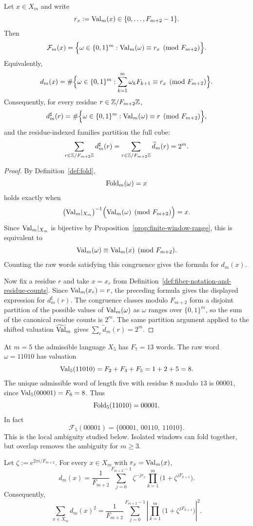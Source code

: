 \begin{theorem}\label{thm:fiber-residue}
Let $x\in X_m$ and write
\[
r_x:=\mathrm{Val}_m(x)\in\{0,\ldots,F_{m+2}-1\}.
\]
Then
\[
\mathcal F_m(x)=
\Bigl\{\omega\in\{0,1\}^m:
\mathrm{Val}_m(\omega)\equiv r_x \pmod {F_{m+2}}\Bigr\}.
\]
Equivalently,
\[
d_m(x)=
\#\Bigl\{\omega\in\{0,1\}^m:
\sum_{k=1}^m\omega_kF_{k+1}\equiv r_x\pmod {F_{m+2}}\Bigr\}.
\]
Consequently, for every residue $r\in\mathbb{Z}/F_{m+2}\mathbb{Z}$,
\[
d_m^\sharp(r)=
\#\Bigl\{\omega\in\{0,1\}^m:
\mathrm{Val}_m(\omega)\equiv r\pmod {F_{m+2}}\Bigr\},
\]
and the residue-indexed families partition the full cube:
\[
\sum_{r\in\mathbb{Z}/F_{m+2}\mathbb{Z}} d_m^\sharp(r)
=
\sum_{r\in\mathbb{Z}/F_{m+2}\mathbb{Z}} \widetilde d_m(r)
=2^m.
\]
\end{theorem}

\begin{proof}
By Definition~\ref{def:fold},
\[
\mathrm{Fold}_m(\omega)=x
\]
holds exactly when
\[
\bigl(\mathrm{Val}_m|_{X_m}\bigr)^{-1}
\Bigl(\mathrm{Val}_m(\omega)\pmod {F_{m+2}}\Bigr)=x.
\]
Since $\mathrm{Val}_m|_{X_m}$ is bijective by
Proposition~\ref{prop:finite-window-range}, this is equivalent to
\[
\mathrm{Val}_m(\omega)\equiv\mathrm{Val}_m(x)\pmod {F_{m+2}}.
\]
Counting the raw words satisfying this congruence gives the formula for
$d_m(x)$.

Now fix a residue $r$ and take $x=x_r$ from
Definition~\ref{def:fiber-notation-and-residue-counts}.  Since
$\mathrm{Val}_m(x_r)=r$, the preceding formula gives the displayed expression for
$d_m^\sharp(r)$.  The congruence classes modulo $F_{m+2}$ form a disjoint
partition of the possible values of $\mathrm{Val}_m(\omega)$ as
$\omega$ ranges over $\{0,1\}^m$, so the sum of the canonical residue counts is
$2^m$.  The same partition argument applied to the shifted valuation
$\widetilde{\mathrm{Val}}_m$ gives
$\sum_r\widetilde d_m(r)=2^m$.
\end{proof}

\begin{remark}[Example at $m=5$]
At $m=5$ the admissible language $X_5$ has $F_7=13$ words. The raw word $\omega=11010$ has valuation
\[
\mathrm{Val}_5(11010)=F_2+F_3+F_5=1+2+5=8.
\]
The unique admissible word of length five with residue $8$ modulo $13$ is $00001$, since $\mathrm{Val}_5(00001)=F_6=8$. Thus
\[
\mathrm{Fold}_5(11010)=00001.
\]
In fact
\[
\mathcal F_5(00001)=\{00001,\ 00110,\ 11010\}.
\]
This is the local ambiguity studied below. Isolated windows can fold together, but overlap removes the ambiguity for $m\ge3$.
\end{remark}

\begin{theorem}\label{thm:fiber-dft}
Let $\zeta:=e^{2\pi i/F_{m+2}}$.  For every $x\in X_m$ with
$r_x=\mathrm{Val}_m(x)$,
\begin{equation}\label{eq:fiber-dft}
d_m(x)
=
\frac{1}{F_{m+2}}
\sum_{j=0}^{F_{m+2}-1}
\zeta^{-jr_x}
\prod_{k=1}^m\bigl(1+\zeta^{jF_{k+1}}\bigr).
\end{equation}
Consequently,
\begin{equation}\label{eq:fiber-second-moment}
\sum_{x\in X_m}d_m(x)^2
=
\frac{1}{F_{m+2}}
\sum_{j=0}^{F_{m+2}-1}
\left|
\prod_{k=1}^m\bigl(1+\zeta^{jF_{k+1}}\bigr)
\right|^2 .
\end{equation}
\end{theorem}

